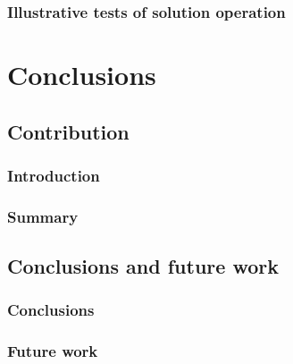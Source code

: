\documentclass[
  oneside,
  11pt, a4paper,
  footinclude=true,
  headinclude=true,
  cleardoublepage=empty
]{scrbook}
\begin{document}
\section{Illustrative tests of solution operation}


\part{Conclusions}

\chapter{Contribution}
\section{Introduction}
\section{Summary}


\chapter{Conclusions and future work}
\section{Conclusions}
\section{Future work}
		
\cleardoublepage
\end{document}
